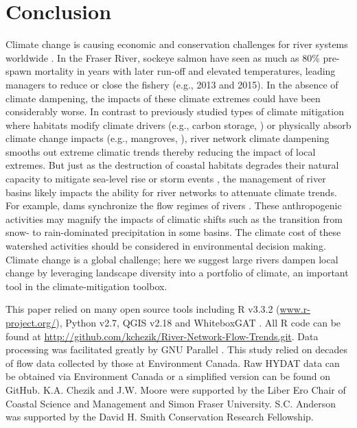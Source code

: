 \documentclass{AGUJournal}
\begin{document}
\section{Conclusion}

Climate change is causing economic and conservation challenges for river systems worldwide \citep{Palmer:2009,Pecl:2017}. In the Fraser River, sockeye salmon have seen as much as 80\% pre-spawn mortality in years with later run-off and elevated temperatures, leading managers to reduce or close the fishery (e.g., 2013 and 2015). In the absence of climate dampening, the impacts of these climate extremes could have been considerably worse. In contrast to previously studied types of climate mitigation where habitats modify climate drivers (e.g., carbon storage, \citep{Jones:2012}) or physically absorb climate change impacts (e.g., mangroves, \citep{Arkema:2013}), river network climate dampening smooths out extreme climatic trends thereby reducing the impact of local extremes. But just as the destruction of coastal habitats degrades their natural capacity to mitigate sea-level rise or storm events \citep{Arkema:2013}, the management of river basins likely impacts the ability for river networks to attenuate climate trends. For example, dams synchronize the flow regimes of rivers \citep{Poff:2007}. These anthropogenic activities may magnify the impacts of climatic shifts such as the transition from snow- to rain-dominated precipitation in some basins. The climate cost of these watershed activities should be considered in environmental decision making. Climate change is a global challenge; here we suggest large rivers dampen local change by leveraging landscape diversity into a portfolio of climate, an important tool in the climate-mitigation toolbox.


\acknowledgments
This paper relied on many open source tools including R v3.3.2 (\url{www.r-project.org/}), Python v2.7, QGIS v2.18 and WhiteboxGAT \citep{Lindsay:2016}. All R code can be found at \url{http://github.com/kchezik/River-Network-Flow-Trends.git}. Data processing was facilitated greatly by GNU Parallel \citep{Tange2011a}. This study relied on decades of flow data collected by those at Environment Canada. Raw HYDAT data can be obtained via Environment Canada or a simplified version can be found on GitHub. K.A. Chezik and J.W. Moore were supported by the Liber Ero Chair of Coastal Science and Management and Simon Fraser University. S.C. Anderson was supported by the David H. Smith Conservation Research Fellowship.
\end{document}

